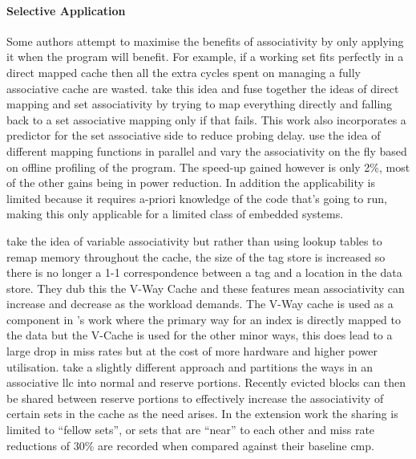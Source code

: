 \paragraph{Selective Application}

Some authors attempt to maximise the benefits of associativity by only applying it when the program will benefit. For example, if a working set fits perfectly in a direct mapped cache then all the extra cycles spent on managing a fully associative cache are wasted. \citet{batsonReactiveassociativeCaches2001} take this idea and fuse together the ideas of direct mapping and set associativity by trying to map everything directly and falling back to a set associative mapping only if that fails. This work also incorporates a predictor for the set associative side to reduce probing delay. \citet{alyVariablewaySetAssociative2003} use the idea of different mapping functions in parallel and vary the associativity on the fly based on offline profiling of the program. The speed-up gained however is only 2\%, most of the other gains being in power reduction. In addition the applicability is limited because it requires a-priori knowledge of the code that's going to run, making this only applicable for a limited class of embedded systems. 

\citet{qureshiVWayCacheDemandbased2005} take the idea of variable associativity but rather than using lookup tables to remap memory throughout the cache, the size of the tag store is increased so there is no longer a 1-1 correspondence between a tag and a location in the data store. They dub this the V-Way Cache and these features mean associativity can increase and decrease as the workload demands. The V-Way cache is used as a component in \citet{deepikaHybridwayCacheMobile2011}'s work where the primary way for an index is directly mapped to the data but the V-Cache is used for the other minor ways, this does lead to a large drop in miss rates but at the cost of more hardware and higher power utilisation. \citet{dasVictimRetentionReducing2014} take a slightly different approach and partitions the ways in an associative \gls{llc} into normal and reserve portions. Recently evicted blocks can then be shared between reserve portions to effectively increase the associativity of certain sets in the cache as the need arises. In the extension work \cite{dasDynamicAssociativityManagement2013} the sharing is limited to ``fellow sets'', or sets that are ``near'' to each other and miss rate reductions of 30\% are recorded when compared against their baseline \gls{cmp}.

